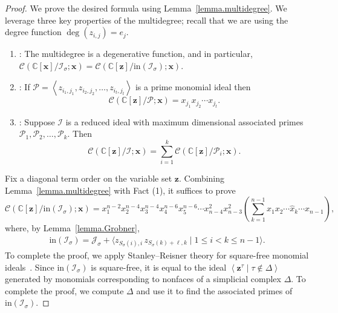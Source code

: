 \documentclass[11pt]{amsart}
\theoremstyle{remark}
\theoremstyle{remark}
\theoremstyle{definition}
\theoremstyle{definition}
\theoremstyle{definition}
\numberwithin{equation}{section}
\newcommand{\C}{\mathbb{C}}           %
\newcommand{\gs}{\sigma}
\newcommand{\cc}{\mathcal{C}}
\newcommand{\ci}{\mathcal{I}}
\newcommand{\cj}{\mathcal{J}}
\newcommand{\cp}{\mathcal{P}} %
\begin{document}
\begin{proof} We prove the desired formula using Lemma~\ref{lemma.multidegree}. We leverage three key properties of the multidegree; recall that we are using the degree function $\deg(z_{i,j})=e_j$.
\begin{enumerate}
\item \cite[Corollary 8.47]{MillerSturmfels2005}: The multidegree is a degenerative function, and in particular, $\cc(\C[\mathbf{x}]/\ci_\gs; \mathbf{x}) = \cc(\C[\mathbf{z}]/\mathrm{in}(\ci_\gs); \mathbf{x})$.
\item \cite[Theorem 8.44]{MillerSturmfels2005}: If $\cp = \left< z_{i_1,j_1}, z_{i_2,j_2} , \ldots, z_{i_t,j_t} \right>$ is a prime monomial ideal then
\[
\mathcal{C}\left(\C[\mathbf{z}] /\cp ; \mathbf{x}\right)= x_{j_1}x_{j_2}\cdots x_{j_t}.
\]
\item \cite[Theorem 8.53]{MillerSturmfels2005}: Suppose $\ci$ is a reduced ideal with maximum dimensional associated primes $\cp_1, \cp_2, \ldots, \cp_k$. Then 
\[
\cc(\C[\mathbf{z}] / \ci; \mathbf{x}) = \sum_{i=1}^k \cc(\C[\mathbf{z}]/ \cp_i; \mathbf{x}).
\]
\end{enumerate}
Fix a diagonal term order on the variable set $\mathbf{z}$. Combining Lemma~\ref{lemma.multidegree} with Fact (1), it suffices to prove
\[
\cc(\C[\mathbf{z}] / \mathrm{in}(\ci_\gs);
\mathbf{x}) = x_1^{n-2}x_2^{n-4}x_3^{n-4}x_4^{n-6}x_5^{n-6} \cdots x_{n-4}^2x_{n-3}^2  \left(  \sum_{k=1}^{n-1} x_1x_{2}\cdots \hat{x}_k \cdots x_{n-1} \right)  ,
\]
where, by Lemma~\ref{lemma.Grobner}, 
\begin{eqnarray}\label{eqn.leadterms}
\mathrm{in}(\ci_\gs) = \cj_\gs + \langle z_{S_\gs(i),i}\,z_{S_\gs(k)+\ell,k} \mid 1\leq i<k\leq n-1\rangle.
\end{eqnarray}
To complete the proof, we apply Stanley--Reisner theory for square-free monomial ideals~\cite[Chapter 1]{MillerSturmfels2005}.  Since $\mathrm{in}(\ci_\gs)$ is square-free, it is equal to the ideal $\left< \mathbf{z}^\tau \mid \tau \notin \Delta \right>$ generated by monomials corresponding to nonfaces of a simplicial complex $\Delta$. To complete the proof, we compute $\Delta$ and use it to find the associated primes of $\mathrm{in}(\ci_\gs)$. 



\end{proof}
\end{document}
